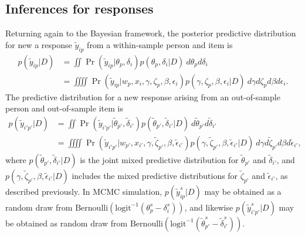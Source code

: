 \documentclass[12pt, letterpaper]{article}
\begin{document}
\subsection{Inferences for responses}

Returning again to the Bayesian framework, the posterior predictive distribution \parencite{rubin1984bayesianly} for new a response $\tilde y_{ip}$ from a within-sample person and item is
\begin{align}
	p(\tilde y_{ip} | D)
	&= \iint
		\Pr (\tilde y_{ip} | \theta_p, \delta_i)
		p(\theta_p, \delta_i | D)
	~d\theta_p d\delta_i \\
	&= \iiiint
		\Pr (\tilde y_{ip} | w_p, x_i, \gamma, \zeta_p, \beta, \epsilon_i)
		p(\gamma, \zeta_p, \beta, \epsilon_i | D)
	~d\gamma d\zeta_p d\beta d\epsilon_i
.\end{align}
The predictive distribution for a new response arising from an out-of-sample person and out-of-sample item is
\begin{align}
	p(\tilde y_{i'p'} | D)
	&= \iint
		\Pr (\tilde y_{i'p'} | \tilde \theta_{p'}, \tilde \delta_{i'})
		p(\tilde \theta_{p'}, \tilde \delta_{i'} | D)
	~d\tilde \theta_{p'} d \tilde \delta_{i'} \\
	&= \iiiint
		\Pr (\tilde y_{i'p'} | w_{p'}, x_{i'}, \gamma, \tilde \zeta_{p'}, 
		                       \beta, \tilde \epsilon_{i'})
		p(\gamma, \tilde \zeta_{p'}, \beta, \tilde \epsilon_{i'} | D)
	~d\gamma d \tilde \zeta_{p'} d \beta d \tilde \epsilon_{i'}
,\end{align}
where
$p(\tilde \theta_{p'}, \tilde \delta_{i'} | D)$ 
is the joint mixed predictive distribution for $\tilde \theta_{p'}$ and $\tilde \delta_{i'}$, and 
$p(\gamma, \tilde \zeta_{p'}, \beta, \tilde \epsilon_{i'} | D)$
includes the mixed predictive distributions for $\tilde \zeta_{p'}$ and $\tilde \epsilon_{i'}$, as described previously.
In MCMC simulation, $p(\tilde y_{ip}^s | D)$ may be obtained as a random draw from
$\mathrm{Bernoulli}(\mathrm{logit}^{-1}(\theta_{p}^s - \delta_{i}^s))$,
and likewise $p(\tilde y_{i'p'}^s | D)$ may be obtained as random draw from
$\mathrm{Bernoulli}(\mathrm{logit}^{-1}(\tilde \theta_{p'}^s - \tilde \delta_{i'}^s))$.
\end{document}

